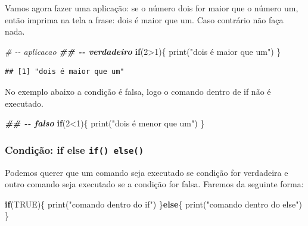 \documentclass[
]{book}
\newenvironment{Shaded}{\begin{snugshade}}{\end{snugshade}}
\newcommand{\CommentTok}[1]{\textcolor[rgb]{0.56,0.35,0.01}{\textit{#1}}}
\newcommand{\ConstantTok}[1]{\textcolor[rgb]{0.00,0.00,0.00}{#1}}
\newcommand{\ControlFlowTok}[1]{\textcolor[rgb]{0.13,0.29,0.53}{\textbf{#1}}}
\newcommand{\DecValTok}[1]{\textcolor[rgb]{0.00,0.00,0.81}{#1}}
\newcommand{\DocumentationTok}[1]{\textcolor[rgb]{0.56,0.35,0.01}{\textbf{\textit{#1}}}}
\newcommand{\FunctionTok}[1]{\textcolor[rgb]{0.00,0.00,0.00}{#1}}
\newcommand{\NormalTok}[1]{#1}
\newcommand{\SpecialCharTok}[1]{\textcolor[rgb]{0.00,0.00,0.00}{#1}}
\newcommand{\StringTok}[1]{\textcolor[rgb]{0.31,0.60,0.02}{#1}}
\begin{document}
Vamos agora fazer uma aplicação: se o número dois for maior que o número um, então imprima na tela a frase: dois é maior que um. Caso contrário não faça nada.

\begin{Shaded}
\begin{Highlighting}[]
\CommentTok{\# {-}{-} aplicacao}
\DocumentationTok{\#\# {-}{-} verdadeiro}
\ControlFlowTok{if}\NormalTok{(}\DecValTok{2}\SpecialCharTok{\textgreater{}}\DecValTok{1}\NormalTok{)\{}
  \FunctionTok{print}\NormalTok{(}\StringTok{"dois é maior que um"}\NormalTok{)}
\NormalTok{\}}
\end{Highlighting}
\end{Shaded}

\begin{verbatim}
## [1] "dois é maior que um"
\end{verbatim}

No exemplo abaixo a condição é falsa, logo o comando dentro de if não é executado.

\begin{Shaded}
\begin{Highlighting}[]
\DocumentationTok{\#\# {-}{-} falso}
\ControlFlowTok{if}\NormalTok{(}\DecValTok{2}\SpecialCharTok{\textless{}}\DecValTok{1}\NormalTok{)\{}
  \FunctionTok{print}\NormalTok{(}\StringTok{"dois é menor que um"}\NormalTok{)}
\NormalTok{\}}
\end{Highlighting}
\end{Shaded}

\hypertarget{condiuxe7uxe3o-if-else-if-else}{%
\subsubsection{\texorpdfstring{Condição: if else \texttt{if()\ else()}}{Condição: if else if() else()}}\label{condiuxe7uxe3o-if-else-if-else}}

Podemos querer que um comando seja executado se condição for verdadeira e outro comando seja executado se a condição for falsa. Faremos da seguinte forma:

\begin{Shaded}
\begin{Highlighting}[]
\ControlFlowTok{if}\NormalTok{(}\ConstantTok{TRUE}\NormalTok{)\{}
  \FunctionTok{print}\NormalTok{(}\StringTok{"comando dentro do if"}\NormalTok{)}
\NormalTok{\}}\ControlFlowTok{else}\NormalTok{\{}
  \FunctionTok{print}\NormalTok{(}\StringTok{"comando dentro do else"}\NormalTok{)}
\NormalTok{\}}
\end{Highlighting}
\end{Shaded}
\end{document}
